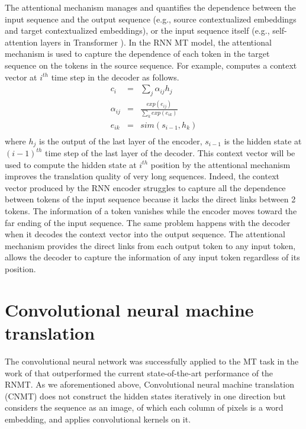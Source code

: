 The attentional mechanism manages and quantifies the dependence between the input sequence and the output sequence (e.g., source contextualized embeddings and target contextualized embeddings), or the input sequence itself (e.g., self-attention layers in Transformer \citep{Vaswani17attention}). In the RNN MT model, the attentional mechanism is used to capture the dependence of each token in the target sequence on the tokens in the source sequence. For example, \cite{Bahdanau15learning} computes a context vector at $i^{th}$ time step in the decoder as follows.
\begin{equation}
\begin{array}{rcl}
c_i &=& \sum_{j} \alpha_{ij} h_j \\
\alpha_{ij} &=& \frac{exp(e_{ij})}{\sum_{k}exp(e_{ik})} \\
e_{ik} &=& sim(s_{i-1},h_k)\\
\end{array}
\end{equation}
where $h_j$ is the output of the last layer of the encoder, $s_{i-1}$ is the hidden state at $(i-1)^{th}$ time step of the last layer of the decoder. This context vector will be used to compute the hidden state at $i^{th}$ position by the attentional mechanism improves the translation quality of very long sequences. Indeed, the context vector produced by the RNN encoder struggles to capture all the dependence between tokens of the input sequence because it lacks the direct links between 2 tokens. The information of a token vanishes while the encoder moves toward the far ending of the input sequence. The same problem happens with the decoder when it decodes the context vector into the output sequence. The attentional mechanism provides the direct links from each output token to any input token, allows the decoder to capture the information of any input token regardless of its position.

\section{Convolutional neural machine translation} \label{sec:cnn}
The convolutional neural network was successfully applied to the MT task in the work of \citet{Ghering17convolutional} that outperformed the current state-of-the-art performance of the RNMT. As we aforementioned above, Convolutional neural machine translation (CNMT) does not construct the hidden states iteratively in one direction but considers the sequence as an image, of which each column of pixels is a word embedding, and applies convolutional kernels on it.
